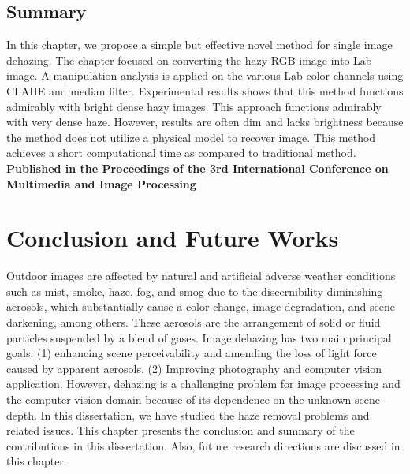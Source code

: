 \documentclass[doctor,english,listoffigures,listoftables]{thesis-uestc}
\begin{document}
\section{Summary}
In this chapter, we propose a simple but effective novel
method for single image dehazing. The chapter focused on converting the hazy RGB image into Lab image. A manipulation analysis is applied on the various Lab color channels using CLAHE and median filter. Experimental results shows that this method functions admirably with bright dense hazy images. This approach functions admirably with very dense haze. However, results are often dim and lacks brightness because the method does not utilize a physical model to recover image. This method achieves a short computational time as compared to traditional method. \textbf{Published in the Proceedings of the 3rd International Conference on Multimedia and Image Processing }







\chapter {Conclusion and Future Works}
\label{Ch3}
Outdoor images are affected by natural and artificial adverse weather conditions such as mist, smoke, haze, fog, and smog due to the discernibility diminishing aerosols, which substantially cause a color change, image degradation, and scene darkening, among others. These aerosols are the arrangement of solid or fluid particles suspended by a blend of gases. Image dehazing has two main principal goals: (1) enhancing scene perceivability and amending the loss of light force caused by apparent aerosols. (2) Improving photography and computer vision application. However, dehazing is a challenging problem for image processing and the computer vision domain because of its dependence on the unknown scene depth. In this dissertation, we have studied the haze removal problems and related issues. This chapter presents the conclusion and summary of the contributions in this dissertation. Also, future research directions are discussed in this chapter.
\end{document}
